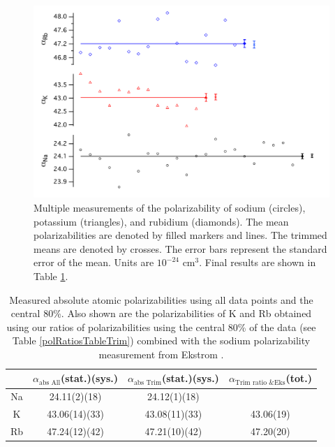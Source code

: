 \begin{figure}
\includegraphics[width=1\textwidth]{Figures/polPRAdataTrim.pdf}
\caption[Multiple measurements of the polarizability of Na, K, and Rb and their trimmed means]{\label{polPRAmeasurementsTrim} Multiple measurements of the polarizability of sodium (circles), potassium (triangles), and rubidium (diamonds). The mean polarizabilities are denoted by filled markers and lines. The trimmed means are denoted by crosses. The error bars represent the standard error of the mean. Units are $10^{-24}$ cm$^3$. Final results are shown in Table \ref{polResultsTableTrim}.}
\end{figure}


\begin{table}
\caption[Measured absolute atomic polarizabilities using all data points and the central 80\%]{\label{polResultsTableTrim}Measured absolute atomic polarizabilities using all data points and the central 80\%. Also shown are the polarizabilities of K and Rb obtained using our ratios of polarizabilities using the central 80\% of the data (see Table \ref{polRatiosTableTrim}) combined with the sodium polarizability measurement from Ekstrom \etal \cite{Eks95}.}
\begin{center}
\begin{tabular}{c c | c | c}
\hline\hline
	& $\alpha_\textrm{abs All}$(stat.)(sys.) & $\alpha_\textrm{abs Trim}$(stat.)(sys.)  & $\alpha_{\textrm{Trim ratio \& Eks}}$(tot.)\\
\hline
Na & 24.11(2)(18) & 24.12(1)(18) & \\
K & 43.06(14)(33) & 43.08(11)(33) & 43.06(19)\\
Rb & 47.24(12)(42) & 47.21(10)(42)  &47.20(20)\\
\hline
\end{tabular}
\end{center}
\end{table}


